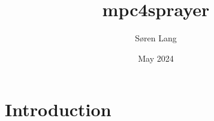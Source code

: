 \documentclass{article}
\title{mpc4sprayer}
\author{Søren Lang}
\date{May 2024}
\begin{document}
\maketitle

\section{Introduction}
\end{document}
